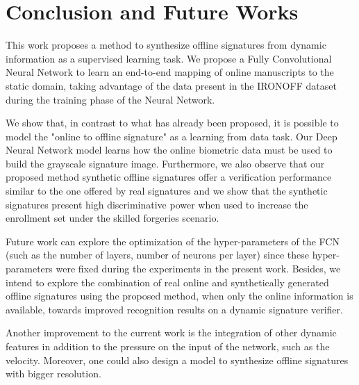 
\chapter{Conclusion and Future Works}\label{ch:conclusion}
This work proposes a method to synthesize offline signatures from dynamic information as a supervised learning task. We propose a Fully Convolutional Neural Network to learn an end-to-end mapping of online manuscripts to the static domain, taking advantage of the data present in the IRONOFF dataset during the training phase of the Neural Network. 

We show that, in contrast to what has already been proposed, it is possible to model the "online to offline signature" as a learning from data task. Our Deep Neural Network model learns how the online biometric data must be used to build the grayscale signature image. Furthermore, we also observe that our proposed method synthetic offline signatures offer a verification performance similar to the one offered by real signatures and we show that the synthetic signatures present high discriminative power when used to increase the enrollment set under the skilled forgeries scenario. 

Future work can explore the optimization of the hyper-parameters of the FCN (such as the number of layers, number of neurons per layer) since these hyper-parameters were fixed during the experiments in the present work. Besides, we intend to explore the combination of real online and synthetically generated offline signatures using the proposed method, when only the online information is available, towards improved recognition results on a dynamic signature verifier.

Another improvement to the current work is the integration of other dynamic features in addition to the pressure on the input of the network, such as the velocity. Moreover, one could also design a model to synthesize offline signatures with bigger resolution.